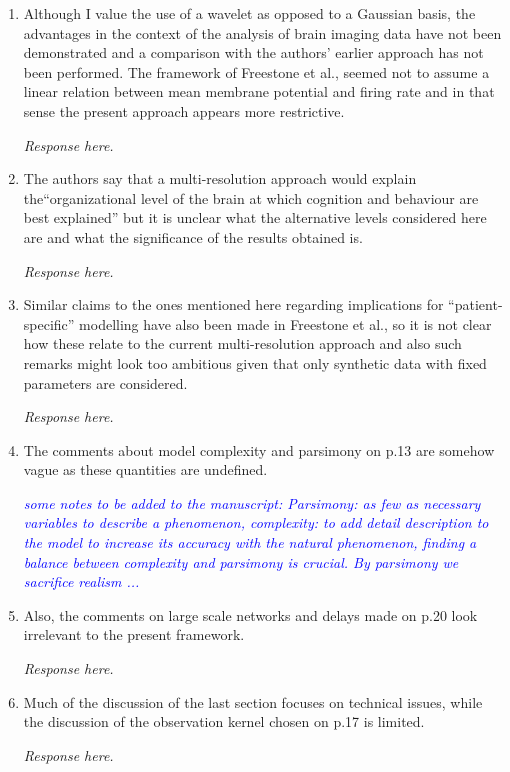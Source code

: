 \documentclass{article}
\newcommand{\parham}[1]{\textcolor{blue}{#1}}
\begin{document}
\begin{enumerate}
        \item Although I value the use of a wavelet as opposed to a Gaussian basis, the advantages in the context of the analysis of brain imaging data have not been demonstrated and a comparison with the authors' earlier approach has not been performed.  The framework of Freestone et al., seemed not to assume a linear relation between mean membrane potential and firing rate and in that sense the present approach appears more restrictive.

\emph{Response here.}

        \item The authors say that a multi-resolution approach would explain the``organizational level of the brain at which cognition and behaviour are best explained'' but it is unclear what the alternative levels considered here are and what the significance of the results obtained is.

\emph{Response here.}

				\item Similar claims to the ones mentioned here regarding  implications for ``patient-specific'' modelling have also been made in Freestone et al., so it is not clear how these relate to the current multi-resolution approach and also such remarks might look too ambitious given that only synthetic data with fixed parameters are considered.
				
				\emph{Response here.}
				
				\item The comments about model complexity and parsimony on p.13 are somehow vague as these quantities are undefined.
				
				\emph{\parham{some notes to be added to the manuscript: Parsimony: as few as necessary variables to describe a phenomenon, complexity: to add detail description to the model to increase its accuracy with the natural phenomenon, finding a balance between complexity and parsimony is crucial. By parsimony we sacrifice realism ...  }}
				
				\item Also, the comments on large scale networks and delays made on p.20 look irrelevant to the present framework.
				
				\emph{Response here.}
				
				\item Much of the discussion of the last section focuses on technical issues, while the discussion of the observation kernel chosen on p.17 is limited.
				
				\emph{Response here.}

    \end{enumerate}
    
\end{document}
